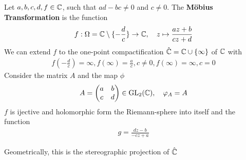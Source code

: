 \begin{definition}
	Let $a,b,c,d,f \in \mathbb{C}$, such that $ad - bc \neq 0$ and $c \neq 0$. The \textbf{Möbius Transformation} is the function
	\begin{align*}
		f: \Omega = \mathbb{C} \setminus \{-\frac{d}{c}\} \to \mathbb{C}, \quad z \mapsto \frac{az + b}{cz + d}
	\end{align*}
	We can extend $f$ to the one-point compactification $\hat{\mathbb{C}} = \mathbb{C} \cup \{\infty\}$ of $\mathbb{C}$ with
	\begin{align*}
		f(-\frac{d}{c}) = \infty, f(\infty) = \frac{a}{c}, c \neq 0, f(\infty) = \infty, c = 0
	\end{align*}
	Consider the matrix $A$ and the map $\phi$
	\begin{align*}
		A = \begin{pmatrix}
		a & b\\
		c & d
	\end{pmatrix} \in \operatorname{GL}_2(\mathbb{C}), \quad \varphi_A = A
	\end{align*}
	$f$ is ijective and holomorphic form the Riemann-sphere into itself and the function
	\begin{align*}
		g = \frac{dz - b}{-cz + a}
	\end{align*}
\end{definition}
Geometrically, this is the stereographic projection of $\hat{\mathbb{C}}$
